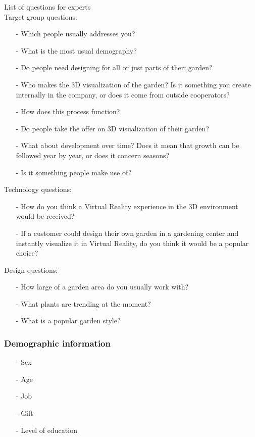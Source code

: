 		List of questions for experts \\
		Target group questions:
		\begin{itemize}
			\item[-] Which people usually addresses you?
			\item[-] What is the most usual demography?
			\item[-] Do people need designing for all or just parts of their garden?
			\item[-] Who makes the 3D visualization of the garden? Is it something you create internally in the company, or does it come from outside cooperators? 
			\item[-] How does this process function?
			\item[-] Do people take the offer on 3D visualization of their garden?
			\item[-] What about development over time? Does it mean that growth can be followed year by year, or does it concern seasons?
			\item[-] Is it something people make use of? \\
		\end{itemize}
		
		Technology questions:
		\begin{itemize}
			\item[-] How do you think a Virtual Reality experience in the 3D environment would be received?
			\item[-] If a customer could design their own garden in a gardening center and instantly visualize it in Virtual Reality, do you think it would be a popular choice? \\
		\end{itemize}
		
		Design questions:
		\begin{itemize}
			\item[-] How large of a garden area do you usually work with?
			\item[-] What plants are trending at the moment?
			\item[-] What is a popular garden style?
		\end{itemize}

		\subsubsection{Demographic information}
		\begin{itemize}
			\item[-] Sex
			\item[-] Age
			\item[-] Job
			\item[-] Gift
			\item[-] Level of education
		\end{itemize}

